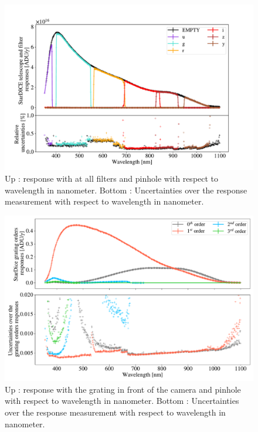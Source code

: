 \begin{figure}[h]
    \centering
    \includegraphics[width=\columnwidth]{fig/stardice_75um_response.pdf}
    \caption{Up : \SD response with at all filters and \spinhole pinhole with respect to wavelength in nanometer. Bottom : Uncertainties over the \SD response measurement with respect to wavelength in nanometer.}
    \label{fig:stardice_75um_response}
\end{figure}

\begin{figure}[h]
    \centering
    \includegraphics[width=\columnwidth]{fig/stardice_grating_response.pdf}
    \caption{Up : \SD response with the grating in front of the camera and \spinhole pinhole with respect to wavelength in nanometer. Bottom : Uncertainties over the \SD response measurement with respect to wavelength in nanometer.}
    \label{fig:stardice_grating_response}
\end{figure}

